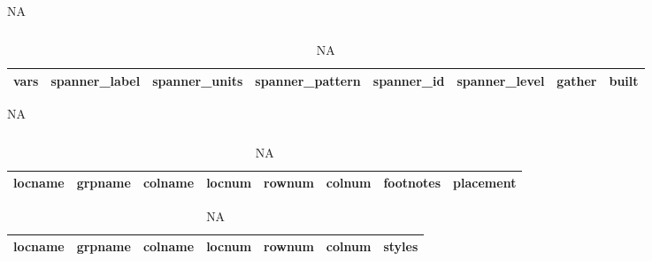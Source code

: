\documentclass[
  letterpaper,
  DIV=11,
  numbers=noendperiod]{scrartcl}
\begin{document}
\begin{table}
{\begin{table}
\begin{tabular}[t]{}
\hline
\end{tabular}
\end{table}
\centering
\begin{tabular}[t]{l|l|l|l|l|r|l|l}
\hline
vars & spanner\_label & spanner\_units & spanner\_pattern & spanner\_id & spanner\_level & gather & built\\


\hline
\end{tabular}\begin{table}
\caption{NA}

\centering
\begin{tabular}[t]{}
\hline

\hline
\end{tabular}
\end{table}
\centering
\begin{tabular}[t]{l|l|l|r|r|r|l|l}
\hline
locname & grpname & colname & locnum & rownum & colnum & footnotes & placement\\


\hline
\end{tabular}\begin{table}
\caption{NA}

\end{table}\begin{table}
\caption{NA}

\end{table}\begin{table}
\caption{NA}

\end{table}
\centering
\begin{tabular}[t]{l|l|l|r|r|r|l}
\hline
locname & grpname & colname & locnum & rownum & colnum & styles\\


\hline
\end{tabular}\begin{table}
\caption{NA}


\end{table}}
\end{table}
\end{document}
